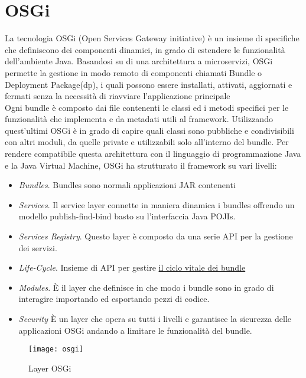 \section{OSGi}
La tecnologia OSGi (Open Services Gateway initiative)
è un insieme di specifiche che definiscono dei componenti
dinamici, in grado di estendere le funzionalità dell'ambiente  Java.
Basandosi su di una architettura a microservizi, OSGi permette la gestione in
modo remoto di componenti chiamati Bundle o Deployment Package(dp), i quali
possono essere installati, attivati, aggiornati e fermati senza la necessità di
riavviare l'applicazione principale\\
Ogni bundle è composto dai file contenenti le classi ed i metodi specifici per le
funzionalità che implementa e da  metadati utili al framework.
Utilizzando quest'ultimi OSGi è in grado di capire quali classi sono pubbliche e
condivisibili con altri moduli, da quelle private e utilizzabili solo
all'interno del bundle.
Per rendere compatibile questa architettura con il linguaggio di programmazione
Java e la Java Virtual Machine, OSGi ha strutturato il framework su vari
livelli:
\begin{itemize}
        \item   \textit{Bundles}. Bundles sono normali applicazioni JAR contenenti
        \item   \textit{Services}. Il service layer connette in maniera dinamica
                i bundles offrendo un modello publish-find-bind basto su
                l'interfaccia Java POJIs.
        \item   \textit{Services Registry}. Questo layer è composto da una serie
                 API per la gestione dei servizi.
        \item   \textit{Life-Cycle}. Insieme di API per gestire \hyperlink{cycle_bundle}{il ciclo vitale
                dei bundle}
        \item   \textit{Modules}. È il layer che definisce in che modo i bundle
                sono in grado di interagire importando ed esportando pezzi di
                codice.
        \item   \textit{Security} È un layer che opera su tutti i livelli e
                garantisce la sicurezza delle applicazioni OSGi andando a
                limitare le funzionalità del bundle.
\end{itemize}
\begin{figure}[th]
\centering 
\texttt{[image: osgi]}
\caption{Layer OSGi}
\label{}
\end{figure}

